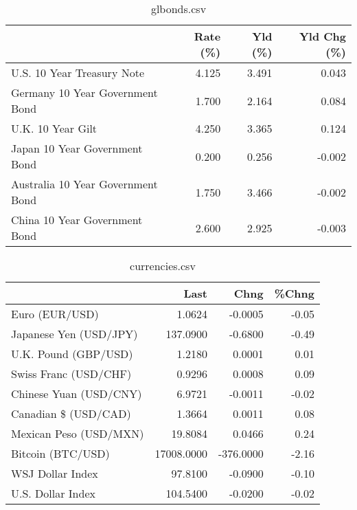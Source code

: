 \documentclass{article}%
\begin{document}
%


\begin{table}[htbp]%
\caption{glbonds.csv}%
\centering%
\begin{adjustbox}{width=1\textwidth}%
\begin{tabular}{lrrr}
\toprule
                                  &  Rate (\%) &  Yld (\%) &  Yld Chg (\%) \\
\midrule
       U.S. 10 Year Treasury Note &     4.125 &    3.491 &        0.043 \\
  Germany 10 Year Government Bond &     1.700 &    2.164 &        0.084 \\
                U.K. 10 Year Gilt &     4.250 &    3.365 &        0.124 \\
    Japan 10 Year Government Bond &     0.200 &    0.256 &       -0.002 \\
Australia 10 Year Government Bond &     1.750 &    3.466 &       -0.002 \\
    China 10 Year Government Bond &     2.600 &    2.925 &       -0.003 \\
\bottomrule
\end{tabular}
%
\end{adjustbox}%
\end{table}

%


\begin{table}[htbp]%
\caption{currencies.csv}%
\centering%
\begin{adjustbox}{width=1\textwidth}%
\begin{tabular}{lrrr}
\toprule
                       &       Last &      Chng &  \%Chng \\
\midrule
        Euro (EUR/USD) &     1.0624 &   -0.0005 &  -0.05 \\
Japanese Yen (USD/JPY) &   137.0900 &   -0.6800 &  -0.49 \\
  U.K. Pound (GBP/USD) &     1.2180 &    0.0001 &   0.01 \\
 Swiss Franc (USD/CHF) &     0.9296 &    0.0008 &   0.09 \\
Chinese Yuan (USD/CNY) &     6.9721 &   -0.0011 &  -0.02 \\
  Canadian \$ (USD/CAD) &     1.3664 &    0.0011 &   0.08 \\
Mexican Peso (USD/MXN) &    19.8084 &    0.0466 &   0.24 \\
     Bitcoin (BTC/USD) & 17008.0000 & -376.0000 &  -2.16 \\
      WSJ Dollar Index &    97.8100 &   -0.0900 &  -0.10 \\
     U.S. Dollar Index &   104.5400 &   -0.0200 &  -0.02 \\
\bottomrule
\end{tabular}
%
\end{adjustbox}%
\end{table}

%
\end{document}

